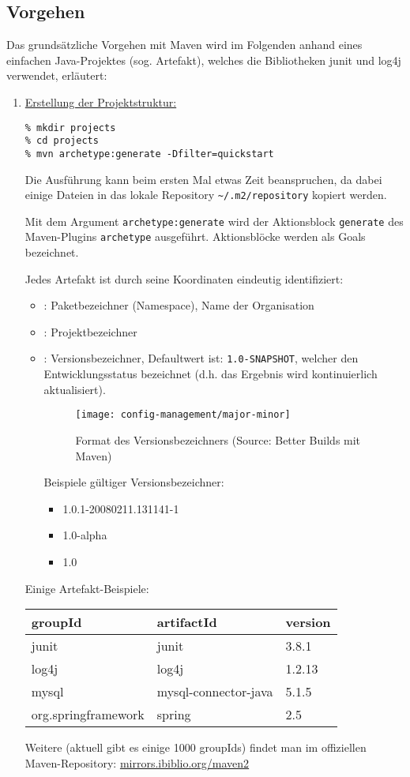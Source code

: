 \subsection{Vorgehen}
Das grundsätzliche Vorgehen mit Maven wird im Folgenden anhand eines einfachen
Java-Projektes (sog. Artefakt), welches die Bibliotheken junit und
log4j verwendet, erläutert:
\begin{enumerate}
\item \underline{Erstellung der Projektstruktur:}
  \begin{lstlisting}
% mkdir projects
% cd projects
% mvn archetype:generate -Dfilter=quickstart
  \end{lstlisting}
  Die Ausführung kann beim ersten Mal etwas Zeit beanspruchen,
  da dabei einige Dateien in das lokale
  Repository \verb+~/.m2/repository+ kopiert werden.

  Mit dem Argument \verb+archetype:generate+ wird der Aktionsblock
  \verb+generate+ des Maven-Plugins \verb+archetype+ ausgeführt.
  Aktionsblöcke werden als Goals bezeichnet.

  Jedes Artefakt ist durch seine Koordinaten eindeutig identifiziert:
  \begin{itemize}
  \item {}: Paketbezeichner (Namespace), Name der Organisation
  \item {}: Projektbezeichner
  \item {}: Versionsbezeichner,
    Defaultwert ist: \verb+1.0-SNAPSHOT+, welcher den
  Entwicklungsstatus bezeichnet (d.h. das Ergebnis wird kontinuierlich
  aktualisiert).
  \begin{figure}[H]
  \begin{center}
  \texttt{[image: config-management/major-minor]}
  \end{center}
  \caption{Format des Versionsbezeichners (Source: Better Builds mit Maven)}
  \end{figure}
\newslide
Beispiele gültiger Versionsbezeichner:
  \begin{itemize}
  \item 1.0.1-20080211.131141-1
  \item 1.0-alpha
  \item 1.0
  \end{itemize}
  \end{itemize}
  Einige Artefakt-Beispiele:
\begin{center}
\begin{tabular}{lll}
groupId & artifactId & version\\
\hline
junit  & junit & 3.8.1\\
log4j & log4j & 1.2.13\\
mysql & mysql-connector-java & 5.1.5\\
org.springframework & spring & 2.5\\
\end{tabular}
\end{center}
Weitere (aktuell gibt es einige 1000 groupIds) findet man im
offiziellen Maven-Repository:
\href{http://mirrors.ibiblio.org/maven2}{mirrors.ibiblio.org/maven2}


\end{enumerate}
